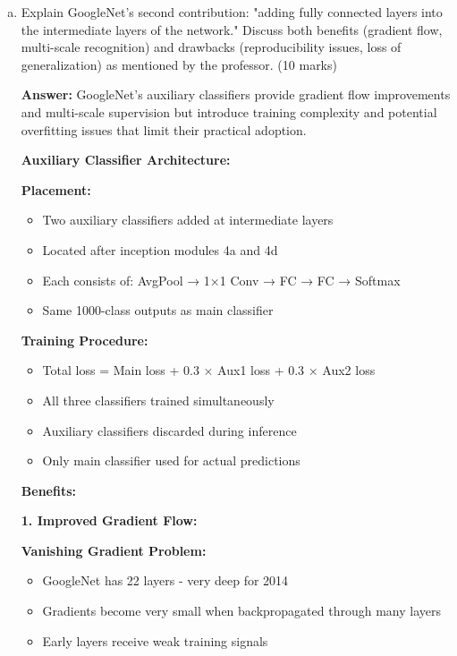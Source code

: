 \documentclass[12pt]{article}
\newcommand{\answer}[1]{{\color{answercolor}\textbf{Answer:} #1}}
\newcommand{\explanation}[1]{{\color{explanationcolor}#1}}
\begin{document}
\begin{enumerate}[(a)]
    \item Explain GoogleNet's second contribution: "adding fully connected layers into the intermediate layers of the network." Discuss both benefits (gradient flow, multi-scale recognition) and drawbacks (reproducibility issues, loss of generalization) as mentioned by the professor. \hfill (10 marks)
    
    \answer{GoogleNet's auxiliary classifiers provide gradient flow improvements and multi-scale supervision but introduce training complexity and potential overfitting issues that limit their practical adoption.}
    
    \explanation{
    \textbf{Auxiliary Classifier Architecture:}
    
    \textbf{Placement:}
    \begin{itemize}
        \item Two auxiliary classifiers added at intermediate layers
        \item Located after inception modules 4a and 4d
        \item Each consists of: AvgPool → 1×1 Conv → FC → FC → Softmax
        \item Same 1000-class outputs as main classifier
    \end{itemize}
    
    \textbf{Training Procedure:}
    \begin{itemize}
        \item Total loss = Main loss + 0.3 × Aux1 loss + 0.3 × Aux2 loss
        \item All three classifiers trained simultaneously
        \item Auxiliary classifiers discarded during inference
        \item Only main classifier used for actual predictions
    \end{itemize}
    
    \textbf{Benefits:}
    
    \textbf{1. Improved Gradient Flow:}
    
    \textbf{Vanishing Gradient Problem:}
    \begin{itemize}
        \item GoogleNet has 22 layers - very deep for 2014
        \item Gradients become very small when backpropagated through many layers
        \item Early layers receive weak training signals
    \end{itemize}
    
}
\end{enumerate}
\end{document}
